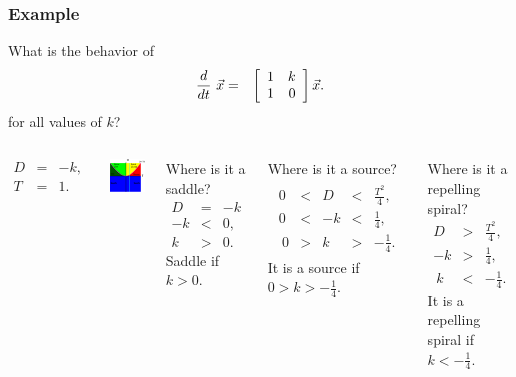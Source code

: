 \begin{frame}
  \frametitle{Example}

  What is the behavior of
  \begin{eqnarray*}
    \deriv{~}{t} \vec{x} & = & \arrayTwo{1}{k}{1}{0} \vec{x}.
  \end{eqnarray*}
  for all values of $k$?


  \begin{columns}
     {
      \begin{eqnarray*}
        D & = & -k, \\
        T & = & 1.
      \end{eqnarray*}

      \centerline{\includegraphics[width=3cm]{img/traceDeterminantExample3}}
    }

     { Where is it a saddle?
      \begin{eqnarray*}
        D & = & -k \\
        -k & < & 0, \\ 
        k & > & 0.
      \end{eqnarray*}
      Saddle if $k>0$.  }

     { Where is it a source?
      \begin{eqnarray*}
        \begin{array}{rcccl}
          0 & < & D & < & \frac{T^2}{4}, \\
          0 & < & -k & < & \frac{1}{4}, \\\
          0 & > &  k & > & -\frac{1}{4}.
        \end{array}
      \end{eqnarray*}
      It is a source if $0 > k > -\frac{1}{4}$.  }

     { Where is it a repelling spiral?
      \begin{eqnarray*}
        D  & > & \frac{T^2}{4}, \\
        -k & > & \frac{1}{4}, \\\
        k  & < & -\frac{1}{4}.
      \end{eqnarray*}
      It is a repelling spiral if $k < -\frac{1}{4}$.

    }

  \end{columns}


\end{frame}

